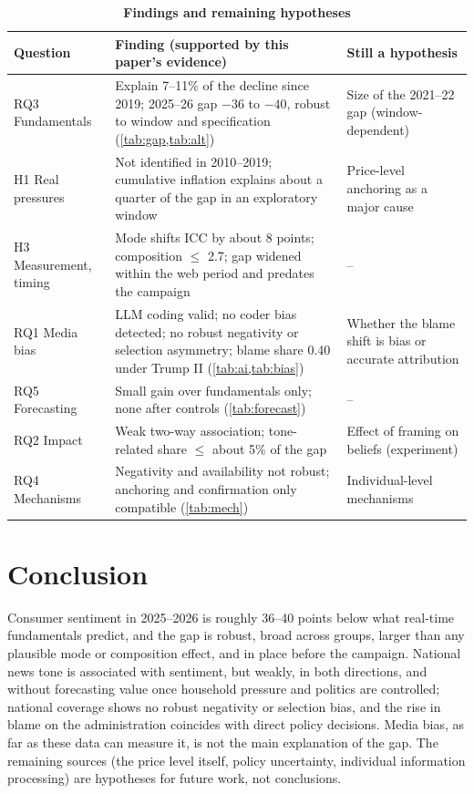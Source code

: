 \documentclass[11pt]{article}
\begin{document}
\begin{table}[htbp]
\centering
\begin{threeparttable}
\caption{\textbf{Findings and remaining hypotheses}}
\label{tab:findings}
\footnotesize
\begin{tabularx}{\textwidth}{@{}>{\raggedright\arraybackslash}p{} >{\raggedright\arraybackslash}X >{\raggedright\arraybackslash}p{}@{}}
\toprule
Question & Finding (supported by this paper's evidence) & Still a hypothesis\\
\midrule
RQ3 Fundamentals & Explain 7–11\% of the decline since 2019; 2025–26 gap $-36$ to $-40$, robust to window and specification (\cref{tab:gap,tab:alt}) & Size of the 2021–22 gap (window-dependent)\\
H1 Real pressures & Not identified in 2010–2019; cumulative inflation explains about a quarter of the gap in an exploratory window & Price-level anchoring as a major cause\\
H3 Measurement, timing & Mode shifts ICC by about 8 points; composition $\leq$ 2.7; gap widened within the web period and predates the campaign & --\\
RQ1 Media bias & LLM coding valid; no coder bias detected; no robust negativity or selection asymmetry; blame share 0.40 under Trump II (\cref{tab:ai,tab:bias}) & Whether the blame shift is bias or accurate attribution\\
RQ5 Forecasting & Small gain over fundamentals only; none after controls (\cref{tab:forecast}) & --\\
RQ2 Impact & Weak two-way association; tone-related share $\leq$ about 5\% of the gap & Effect of framing on beliefs (experiment)\\
RQ4 Mechanisms & Negativity and availability not robust; anchoring and confirmation only compatible (\cref{tab:mech}) & Individual-level mechanisms\\
\bottomrule
\end{tabularx}
\end{threeparttable}
\end{table}

\section{Conclusion}\label{sec:conclusion}

Consumer sentiment in 2025–2026 is roughly 36–40 points below what real-time fundamentals predict, and the gap is robust, broad across groups, larger than any plausible mode or composition effect, and in place before the campaign. National news tone is associated with sentiment, but weakly, in both directions, and without forecasting value once household pressure and politics are controlled; national coverage shows no robust negativity or selection bias, and the rise in blame on the administration coincides with direct policy decisions. Media bias, as far as these data can measure it, is not the main explanation of the gap. The remaining sources (the price level itself, policy uncertainty, individual information processing) are hypotheses for future work, not conclusions.
\end{document}
